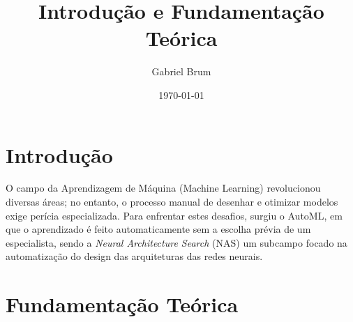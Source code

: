 \documentclass[a4paper,12pt]{article}
\title{\textbf{Introdução e Fundamentação Teórica}}
\author{Gabriel Brum}
\date{\today}
\begin{document}
\maketitle

\section{Introdução}
O campo da Aprendizagem de Máquina (Machine Learning) revolucionou diversas áreas; no entanto, o processo manual de desenhar e otimizar modelos exige perícia especializada. Para enfrentar estes desafios, surgiu o AutoML, em que o aprendizado é feito automaticamente sem a escolha prévia de um especialista, sendo a \textit{Neural Architecture Search} (NAS) um subcampo focado na automatização do design das arquiteturas das redes neurais.

\section{Fundamentação Teórica}
\end{document}
